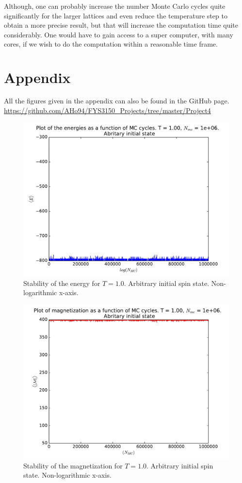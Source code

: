 \documentclass[12pt]{article}
\begin{document}
Although, one can probably increase the number Monte Carlo cycles quite significantly for the larger lattices and even reduce the temperature step to obtain a more precise result, but that will increase the computation time quite considerably. One would have to gain access to a super computer, with many cores, if we wish to do the computation within a reasonable time frame.
\FloatBarrier

\section{Appendix}
All the figures given in the appendix can also be found in the GitHub page.
\url{https://github.com/AHo94/FYS3150_Projects/tree/master/Project4}
\begin{figure}[H]
\centering
\includegraphics[width=\linewidth]{Plots/Energy_stability_T1.pdf}
\caption{Stability of the energy for $T = 1.0$. Arbitrary initial spin state. Non-logarithmic x-axis.}
\end{figure}

\begin{figure}[H]
\centering
\includegraphics[width=\linewidth]{Plots/Magnetization_stability_T1.pdf}
\caption{Stability of the magnetization for $T=1.0$. Arbitrary initial spin state. Non-logarithmic x-axis.}
\end{figure}
\end{document}
